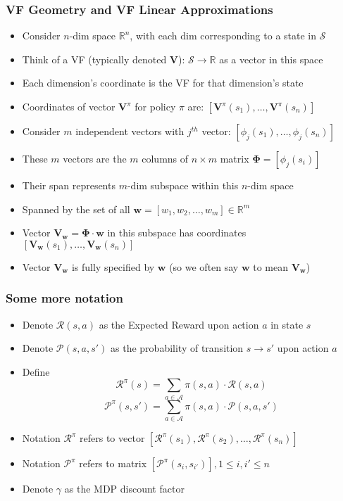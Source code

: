 \documentclass[handout]{beamer}
\newcommand{\vw}{\bm{V_w}}
\newcommand{\vpi}{\bm{V}^{\pi}}
\newcommand{\bphi}{\bm{\Phi}}
\newcommand{\bv}{\bm{V}}
\newcommand{\bw}{\bm{w}}
\newcommand{\brew}{\bm{\mathcal{R}}^{\pi}}
\newcommand{\bprob}{\bm{\mathcal{P}}^{\pi}}
\begin{document}
\begin{frame}
\frametitle{VF Geometry and VF Linear Approximations}
\pause
\begin{itemize}[<+->]
\item Consider $n$-dim space $\mathbb{R}^n$, with each dim corresponding to a state in $\mathcal{S}$
\item Think of a VF (typically denoted $\bv$): $\mathcal{S} \rightarrow \mathbb{R}$ as a vector in this space
\item Each dimension's coordinate is the VF for that dimension's state
\item Coordinates of vector $\vpi$ for policy $\pi$ are: $[\vpi(s_1), \ldots, \vpi(s_n)]$
\item Consider $m$ independent vectors with $j^{th}$ vector: $[\phi_j(s_1), \ldots, \phi_j(s_n)]$
\item These $m$ vectors are the $m$ columns of $n \times m$ matrix $\bphi = [\phi_j(s_i)]$
\item Their span represents $m$-dim subspace within this $n$-dim space
\item Spanned by the set of all $\bw = [w_1, w_2, \ldots, w_m] \in \mathbb{R}^m$
\item Vector $\vw = \bphi \cdot \bw$ in this subspace has coordinates $[\vw(s_1), \ldots , \vw(s_n)]$
\item Vector $\vw$ is fully specified by $\bw$ (so we often say $\bw$ to mean $\vw$)
\end{itemize}
\end{frame}

\begin{frame}
\frametitle{Some more notation}
\pause
\begin{itemize}[<+->]
\item Denote $\mathcal{R}(s,a)$ as the Expected Reward upon action $a$ in state $s$
\item Denote $\mathcal{P}(s,a,s')$ as the probability of transition $s \rightarrow s'$ upon action $a$
\item Define
$$\brew(s) = \sum_{a \in \mathcal{A}} \pi(s, a) \cdot \mathcal{R}(s,a)$$
$$\bprob(s,s') = \sum_{a \in \mathcal{A}} \pi(s, a) \cdot \mathcal{P}(s,a,s')$$
\item Notation $\brew$ refers to vector $[\brew(s_1), \brew(s_2), \ldots, \brew(s_n)]$
\item Notation $\bprob$ refers to matrix $[\bprob(s_i, s_{i'})], 1 \leq i, i' \leq n$ 
\item Denote $\gamma$ as the MDP discount factor
\end{itemize}
\end{frame}
\end{document}
